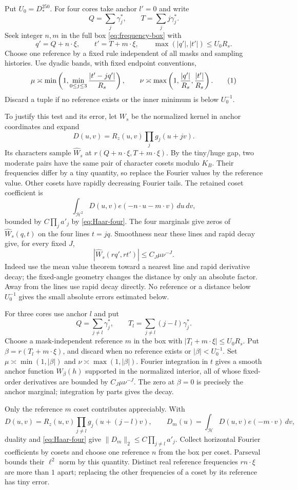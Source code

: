 \documentclass[11pt]{article}
\theoremstyle{definition}
\newcommand{\eqtag}[1]{\refstepcounter{equation}\tag{\theequation}\label{#1}}
\numberwithin{equation}{section}
\begin{document}
Put $U_0=D_*^{250}$. For four cores take anchor $l'=0$ and write
\[
 Q=\sum_j\gamma_j^*,\qquad T=\sum_jj\gamma_j^*.
\]
Seek integer $n,m$ in the full box \eqref{eq:frequency-box} with
\[
 q'=Q+n\cdot\xi,\qquad t'=T+m\cdot\xi,\qquad\max(|q'|,|t'|)\le U_0R_s.
\]
Choose one reference by a fixed rule independent of all masks and sampling histories. Use dyadic bands, with fixed endpoint conventions,
\[
 \mu\asymp\min\left(1,\min_{0\le j\le3}\frac{|t'-jq'|}{R_s}\right),\qquad
 \nu\asymp\max\left(1,\frac{|q'|}{R_s},\frac{|t'|}{R_s}\right).
 \eqtag{eq:four-tests}
\]
Discard a tuple if no reference exists or the inner minimum is below $U_0^{-1}$.

To justify this test and its error, let $W_s$ be the normalized kernel in anchor coordinates and expand
\[
 D(u,v)=R_z(u,v)\prod_jg_j(u+jv).
\]
Its characters sample $\widehat W_s$ at $r(Q+n\cdot\xi,T+m\cdot\xi)$. By the tiny/huge gap, two moderate pairs have the same pair of character cosets modulo $K_B$. Their frequencies differ by a tiny quantity, so replace the Fourier values by the reference value. Other cosets have rapidly decreasing Fourier tails. The retained coset coefficient is
\[
 \int_{\mathcal H^2}D(u,v)e(-n\cdot u-m\cdot v)\,du\,dv,
\]
bounded by $C\prod_ja'_j$ by \eqref{eq:Haar-four}. The four marginals give zeros of $\widehat W_s(q,t)$ on the four lines $t=jq$. Smoothness near these lines and rapid decay give, for every fixed $J$,
\[
 |\widehat W_s(rq',rt')|\le C_J\mu\nu^{-J}.
\]
Indeed use the mean value theorem toward a nearest line and rapid derivative decay; the fixed-angle geometry changes the distance by only an absolute factor. Away from the lines use rapid decay directly. No reference or a distance below $U_0^{-1}$ gives the small absolute errors estimated below.

For three cores use anchor $l$ and put
\[
 Q=\sum_{j\ne l}\gamma_j^*,\qquad T_l=\sum_{j\ne l}(j-l)\gamma_j^*.
\]
Choose a mask-independent reference $m$ in the box with $|T_l+m\cdot\xi|\le U_0R_s$. Put $\beta=r(T_l+m\cdot\xi)$, and discard when no reference exists or $|\beta|<U_0^{-1}$. Set $\mu\asymp\min(1,|\beta|)$ and $\nu\asymp\max(1,|\beta|)$. Fourier integration in $t$ gives a smooth anchor function $W_\beta(h)$ supported in the normalized interior, all of whose fixed-order derivatives are bounded by $C_J\mu\nu^{-J}$. The zero at $\beta=0$ is precisely the anchor marginal; integration by parts gives the decay.

Only the reference $m$ coset contributes appreciably. With
\[
 D(u,v)=R_z(u,v)\prod_{j\ne l}g_j(u+(j-l)v),\qquad
 D_m(u)=\int_{\mathcal H}D(u,v)e(-m\cdot v)\,dv,
\]
duality and \eqref{eq:Haar-four} give $\|D_m\|_2\le C\prod_{j\ne l}a'_j$. Collect horizontal Fourier coefficients by cosets and choose one reference $n$ from the box per coset. Parseval bounds their $\ell^2$ norm by this quantity. Distinct real reference frequencies $rn\cdot\xi$ are more than $1$ apart; replacing the other frequencies of a coset by its reference has tiny error.
\end{document}
